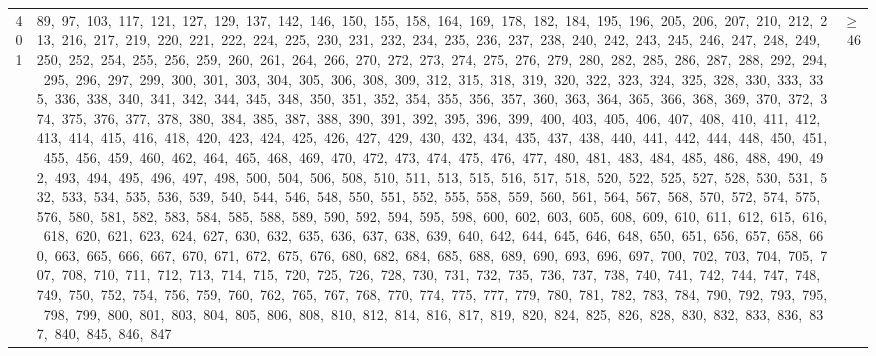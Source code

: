 \begin{longtable}{c|p{}|r}
401 & 89,\ 97,\ 103,\ 117,\ 121,\ 127,\ 129,\ 137,\ 142,\ 146,\ 150,\ 155,\ 158,\ 164,\ 169,\ 178,\ 182,\ 184,\ 195,\ 196,\ 205,\ 206,\ 207,\ 210,\ 212,\ 213,\ 216,\ 217,\ 219,\ 220,\ 221,\ 222,\ 224,\ 225,\ 230,\ 231,\ 232,\ 234,\ 235,\ 236,\ 237,\ 238,\ 240,\ 242,\ 243,\ 245,\ 246,\ 247,\ 248,\ 249,\ 250,\ 252,\ 254,\ 255,\ 256,\ 259,\ 260,\ 261,\ 264,\ 266,\ 270,\ 272,\ 273,\ 274,\ 275,\ 276,\ 279,\ 280,\ 282,\ 285,\ 286,\ 287,\ 288,\ 292,\ 294,\ 295,\ 296,\ 297,\ 299,\ 300,\ 301,\ 303,\ 304,\ 305,\ 306,\ 308,\ 309,\ 312,\ 315,\ 318,\ 319,\ 320,\ 322,\ 323,\ 324,\ 325,\ 328,\ 330,\ 333,\ 335,\ 336,\ 338,\ 340,\ 341,\ 342,\ 344,\ 345,\ 348,\ 350,\ 351,\ 352,\ 354,\ 355,\ 356,\ 357,\ 360,\ 363,\ 364,\ 365,\ 366,\ 368,\ 369,\ 370,\ 372,\ 374,\ 375,\ 376,\ 377,\ 378,\ 380,\ 384,\ 385,\ 387,\ 388,\ 390,\ 391,\ 392,\ 395,\ 396,\ 399,\ 400,\ 403,\ 405,\ 406,\ 407,\ 408,\ 410,\ 411,\ 412,\ 413,\ 414,\ 415,\ 416,\ 418,\ 420,\ 423,\ 424,\ 425,\ 426,\ 427,\ 429,\ 430,\ 432,\ 434,\ 435,\ 437,\ 438,\ 440,\ 441,\ 442,\ 444,\ 448,\ 450,\ 451,\ 455,\ 456,\ 459,\ 460,\ 462,\ 464,\ 465,\ 468,\ 469,\ 470,\ 472,\ 473,\ 474,\ 475,\ 476,\ 477,\ 480,\ 481,\ 483,\ 484,\ 485,\ 486,\ 488,\ 490,\ 492,\ 493,\ 494,\ 495,\ 496,\ 497,\ 498,\ 500,\ 504,\ 506,\ 508,\ 510,\ 511,\ 513,\ 515,\ 516,\ 517,\ 518,\ 520,\ 522,\ 525,\ 527,\ 528,\ 530,\ 531,\ 532,\ 533,\ 534,\ 535,\ 536,\ 539,\ 540,\ 544,\ 546,\ 548,\ 550,\ 551,\ 552,\ 555,\ 558,\ 559,\ 560,\ 561,\ 564,\ 567,\ 568,\ 570,\ 572,\ 574,\ 575,\ 576,\ 580,\ 581,\ 582,\ 583,\ 584,\ 585,\ 588,\ 589,\ 590,\ 592,\ 594,\ 595,\ 598,\ 600,\ 602,\ 603,\ 605,\ 608,\ 609,\ 610,\ 611,\ 612,\ 615,\ 616,\ 618,\ 620,\ 621,\ 623,\ 624,\ 627,\ 630,\ 632,\ 635,\ 636,\ 637,\ 638,\ 639,\ 640,\ 642,\ 644,\ 645,\ 646,\ 648,\ 650,\ 651,\ 656,\ 657,\ 658,\ 660,\ 663,\ 665,\ 666,\ 667,\ 670,\ 671,\ 672,\ 675,\ 676,\ 680,\ 682,\ 684,\ 685,\ 688,\ 689,\ 690,\ 693,\ 696,\ 697,\ 700,\ 702,\ 703,\ 704,\ 705,\ 707,\ 708,\ 710,\ 711,\ 712,\ 713,\ 714,\ 715,\ 720,\ 725,\ 726,\ 728,\ 730,\ 731,\ 732,\ 735,\ 736,\ 737,\ 738,\ 740,\ 741,\ 742,\ 744,\ 747,\ 748,\ 749,\ 750,\ 752,\ 754,\ 756,\ 759,\ 760,\ 762,\ 765,\ 767,\ 768,\ 770,\ 774,\ 775,\ 777,\ 779,\ 780,\ 781,\ 782,\ 783,\ 784,\ 790,\ 792,\ 793,\ 795,\ 798,\ 799,\ 800,\ 801,\ 803,\ 804,\ 805,\ 806,\ 808,\ 810,\ 812,\ 814,\ 816,\ 817,\ 819,\ 820,\ 824,\ 825,\ 826,\ 828,\ 830,\ 832,\ 833,\ 836,\ 837,\ 840,\ 845,\ 846,\ 847 & $\ge$ 46 \\

\end{longtable}
